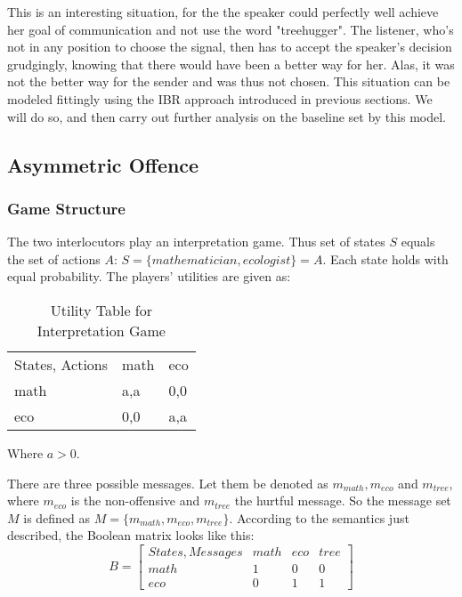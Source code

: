 \documentclass[10]{article}
\begin{document}
This is an interesting situation, for the the speaker could perfectly well achieve her goal of communication and not use the word "treehugger". The listener, who's not in any position to choose the signal, then has to accept the speaker's decision grudgingly, knowing that there would have been a better way for her. Alas, it was not the better way for the sender and was thus not chosen. This situation can be modeled fittingly using the IBR approach introduced in previous sections. We will do so, and then carry out further analysis on the baseline set by this model.
\subsection{Asymmetric Offence}
\subsubsection{Game Structure}
The two interlocutors play an interpretation game. Thus set of states $S$ equals the set of actions $A$: $S=\{mathematician,ecologist\}=A$. Each state holds with equal probability. The players' utilities are given as:\\

\begin{table}[h]
\centering
\caption{Utility Table for Interpretation Game}
\label{my-label}
\begin{tabular}{lll}
States, Actions & math & eco \\
math            & a,a  & 0,0 \\
eco             & 0,0  & a,a
\end{tabular}
\end{table}
Where $a>0$.

There are three possible messages. Let them be denoted as $m_{math},m_{eco}$ and $m_{tree}$, where $m_{eco}$ is the non-offensive and $m_{tree}$ the hurtful message. So the message set $M$ is defined as $M=\{m_{math},m_{eco},m_{tree}\}$. According to the semantics just described, the Boolean matrix looks like this:\\
\begin{equation*}
B =
\begin{bmatrix}

States, Messages & math & eco & tree \\
math             & 1    & 0   & 0    \\
eco              & 0    & 1   & 1   
\end{bmatrix}
\end{equation*}
\end{document}
